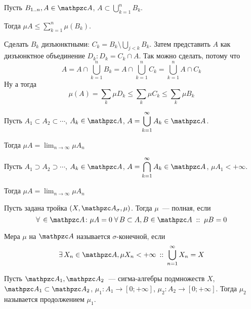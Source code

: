 \documentclass[12pt, timbord]{longnotes}
\begin{document}
\begin{prop}\label{prop:meas::meas::semiadd}
  Пусть $B_{1 \intrng n}, A \in \alg$, $A \subset \displaystyle \bigcup_{k=1}^n B_k$. \par
  Тогда $\displaystyle\mu A \leqslant \sum_{k=1}^n \mu(B_k)$.
\end{prop}
\begin{lproof}
  Сделать $B_k$ дизъюнктными: $C_k = B_k \setminus \bigcup_{j <k} B_k$. Затем представить $A$ как
  дизъюнктное объединение $D_k \colon D_k = C_k \cap A$. Так можно сделать, потому что
  \[
    A = A \cap \bigcup_{k=1}^n B_k = A \cap \bigcup_{k=1}^n C_k = \bigcup_{k=1}^n A \cap C_k
  \]
  Ну а тогда
  \[
    \mu (A) = \sum_k \mu D_k \leqslant \sum_k \mu C_k \leqslant \sum_k \mu B_k
  \]
\end{lproof}


\begin{prop}\label{prop:meas::meas::bcont}
  Пусть $A_1 \subset A_2 \subset \cdots$, $A_k \in \alg$,
  $\displaystyle A = \bigcup_{k=1}^\infty A_k \in \alg$.
   \par
  Тогда $\displaystyle \mu A = \lim_{n\to \infty} \mu A_n$
\end{prop}
\begin{prop}\label{prop:meas::meas::ucont}
  Пусть $A_1 \supset A_2 \supset \cdots$, $A_k \in \alg$, 
  $\displaystyle A = \bigcap_{k=1}^\infty A_k \in \alg$, $\mu A_1 < +\infty $.
  \par
  Тогда $\displaystyle \mu A = \lim_{n\to \infty} \mu A_n$
\end{prop}


\begin{defn}\label{defn:meas::ledeg::compl}
  Пусть задана тройка $(X, \alg_\sigma, \mu)$. Тогда $\mu$~--- полная, если 
  \[
    \forall\, \in \alg \colon \mu A = 0 \; \forall\, B \subset A, B \in \alg \;::\; \mu B = 0
  \]
\end{defn}

\begin{defn}\label{defn:meas::ledeg::sfin}
  Мера $\mu$  на $\alg$ называется $\sigma$-конечной, если 
  \[
    \exists\, X_n \in \alg, \mu X_n < + \infty \that \bigcup_{n=1}^\infty X_n = X
  \]
\end{defn}

\begin{defn}\label{defn:meas::ledeg::mcont}
  Пусть $\alg_1, \alg_2$~--- сигма-алгебры подмножеств $X$, $\alg_1 \subset \alg_2$,
  $\mu_1 \colon A_1 \to [0;+\infty] $, $\mu_2 \colon A_2 \to [0;+\infty]$. 
  Тогда $\mu_2$ называется продолжением $\mu_1$.
\end{defn}
\end{document}
